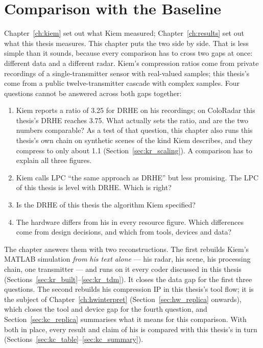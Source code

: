 \chapter{Comparison with the Baseline}
\label{ch:vskiem}

Chapter~\ref{ch:kiem} set out what Kiem measured; Chapter~\ref{ch:results} set
out what this thesis measures. This chapter puts the two side by side. That is
less simple than it sounds, because every comparison has to cross two gaps at
once: different data and a different radar. Kiem's compression ratios come from
private recordings of a single-transmitter sensor with real-valued samples;
this thesis's come from a public twelve-transmitter cascade with complex
samples. Four questions cannot be answered across both gaps together:

\begin{enumerate}
\item Kiem reports a ratio of \num{3.25} for DRHE on his recordings; on
ColoRadar this thesis's DRHE reaches \num{3.75}. What actually sets the ratio,
and are the two numbers comparable? As a test of that question, this chapter
also runs this thesis's own chain on synthetic scenes of the kind Kiem
describes, and they compress to only about \num{1.1}
(Section~\ref{sec:kr_scaling}). A comparison has to explain all three
figures.
\item Kiem calls LPC ``the same approach as DRHE'' but less promising. The LPC of
this thesis is level with DRHE. Which is right?
\item Is the DRHE of this thesis the algorithm Kiem specified?
\item The hardware differs from his in every resource figure. Which differences
come from design decisions, and which from tools, devices and data?
\end{enumerate}

\noindent
The chapter answers them with two reconstructions. The first rebuilds Kiem's
MATLAB simulation \emph{from his text alone} --- his radar, his scene, his
processing chain, one transmitter --- and runs on it every coder discussed in
this thesis (Sections~\ref{sec:kr_built}--\ref{sec:kr_tdm}). It closes the
data gap for the first three questions. The second rebuilds his compression IP
in this thesis's tool flow; it is the subject of Chapter~\ref{ch:hwinterpret}
(Section~\ref{sec:hw_replica} onwards), which closes the tool and device gap
for the fourth question, and Section~\ref{sec:kc_replica} summarises what it
means for this comparison. With both in place, every result and claim of
his is compared with this thesis's in turn
(Sections~\ref{sec:kc_table}--\ref{sec:kc_summary}).

